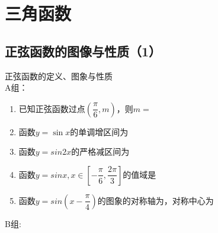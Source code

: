 \chapter{三角函数}

\section{正弦函数的图像与性质（1）}
\zsd 正弦函数的定义、图象与性质 \\
A组：
\begin{enumerate}
    \item 已知正弦函数过点$\left(\dfrac{\pi}{6}, m\right)$，则$m = $
    \item 函数$y=\sin{x}$的单调增区间为
    \item 函数$y = sin2x$的严格减区间为
    \item 函数$y = sinx, x \in \left[-\dfrac{\pi}{6}, \dfrac{2\pi}{3}\right]$的值域是
    \item 函数$y = sin\left(x - \dfrac{\pi}{4}\right)$的图象的对称轴为，对称中心为
\end{enumerate}
B组:
